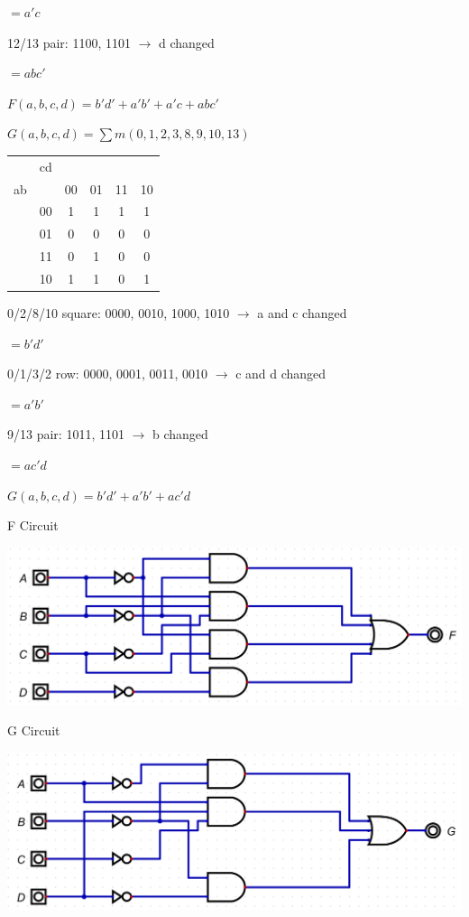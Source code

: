 \documentclass{article}
\begin{document}
    \quad $=a'c$

    12/13 pair: 1100, 1101 $\rightarrow$ d changed

    \quad $=abc'$

    $\boxed{F(a,b,c,d) = b'd' + a'b' + a'c + abc'}$

    $G(a,b,c,d) = \sum m (0,1,2,3,8,9,10,13)$

    \begin{center}
        \begin{tabular} {cc|cccc}
            & cd & &&& \\
            ab && 00 & 01 & 11 & 10 \\
            \hline
            & 00 & 1 & 1 & 1 & 1 \\
            & 01 & 0 & 0 & 0 & 0 \\
            & 11 & 0 & 1 & 0 & 0 \\
            & 10 & 1 & 1 & 0 & 1 \\
        \end{tabular}
    \end{center}

    0/2/8/10 square: 0000, 0010, 1000, 1010 $\rightarrow$ a and c changed

    \quad $=b'd'$

    0/1/3/2 row: 0000, 0001, 0011, 0010 $\rightarrow$ c and d changed

    \quad $=a'b'$

    9/13 pair: 1011, 1101 $\rightarrow$ b changed

    \quad $=ac'd$

    $\boxed{G(a,b,c,d) = b'd' + a'b' + ac'd}$

    F Circuit

    \begin{center}
        \includegraphics[width=\linewidth]{q8-f.jpg}
    \end{center}

    G Circuit

    \begin{center}
        \includegraphics[width=\linewidth]{q8-g.jpg}
    \end{center}
\end{document}
